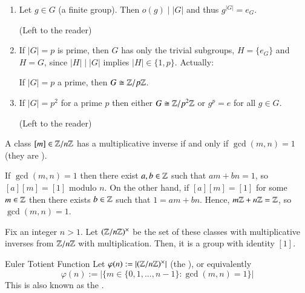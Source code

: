 \documentclass[12pt, a4paper, twoside, openright, titlepage]{book}
\begin{document}
\begin{eg}{}{}
        \leavevmode
        \begin{enumerate}
                \item Let $g \in G$ (a finite group). Then $o(g)\;\vert\;|G|$ and thus $g^{|G|} = e_G$.
                        \begin{proof*}{}{}
                                (Left to the reader)
                        \end{proof*}
                \item If $|G| = p$ is prime, then $G$ has only the trivial subgroups, $H = \{e_G\}$ and $H = G$, since $|H|\;\vert\;|G|$ implies $|H| \in \{1,p\}$. Actually:
                        \begin{cor}{}{}
                                If $|G| = p$ a prime, then $G \cong \mathbb Z/p\mathbb Z$.
                        \end{cor}
                \item If $|G| = p^2$ for a prime $p$ then either $G \cong \mathbb Z/p^2\mathbb Z$ or $g^p = e$ for all $g \in G$.
                        \begin{proof*}{}{}
                                (Left to the reader)
                        \end{proof*}
        \end{enumerate}
\end{eg}


\begin{rmk}{}{}
        A class $[m] \in \mathbb Z/n\mathbb Z$ has a multiplicative inverse if and only if $\gcd(m,n) = 1$ (they are ).
\end{rmk}
\begin{proof*}{}{}
        If $\gcd(m,n) = 1$ then there exist $a,b \in \mathbb Z$ such that $am + bn = 1$, so $[a][m] = [1]$ modulo $n$. On the other hand, if $[a][m] = [1]$ for some $m \in \mathbb Z$ then there exists $b \in \mathbb Z$ such that $1 = am+bn$. Hence, $m\mathbb Z + n\mathbb Z = \mathbb Z$, so $\gcd(m,n) = 1$.
\end{proof*}

\begin{defn}{}{}
        Fix an integer $n > 1$. Let $(\mathbb Z/n\mathbb Z)^{\times}$ be the set of these classes with multiplicative inverses from $\mathbb Z/n\mathbb Z$ with multiplication. Then, it is a group with identity $[1]$.
\end{defn}

\begin{defn}{Euler Totient Function}{}
        Let $\varphi(n) :=|(\mathbb Z/n\mathbb Z)^{\times}|$ (the ), or equivalently \begin{equation}
                \varphi(n) := |\{m \in \{0,1,...,n-1\}:\gcd(m,n) = 1\}|
        \end{equation}
        This is also known as the .
\end{defn}
\end{document}
